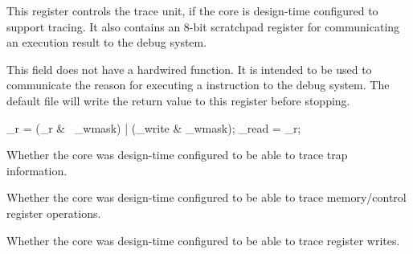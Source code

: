 \implementation{}


This register controls the trace unit, if the core is design-time configured to
support tracing. It also contains an 8-bit scratchpad register for communicating
an execution result to the debug system.

\signed{}
This field does not have a hardwired function. It is intended to be used to
communicate the reason for executing a  instruction to the debug
system. The default  file will write the  return
value to this register before stopping.

\declaration{}
\implementation{}
_r = (_r & ~_wmask) | (_write & _wmask);
_read = _r;

\reset{*}
Whether the core was design-time configured to be able to trace trap
information.

\implementation{}

\reset{*}
Whether the core was design-time configured to be able to trace memory/control
register operations.

\implementation{}

\reset{*}
Whether the core was design-time configured to be able to trace register writes.

